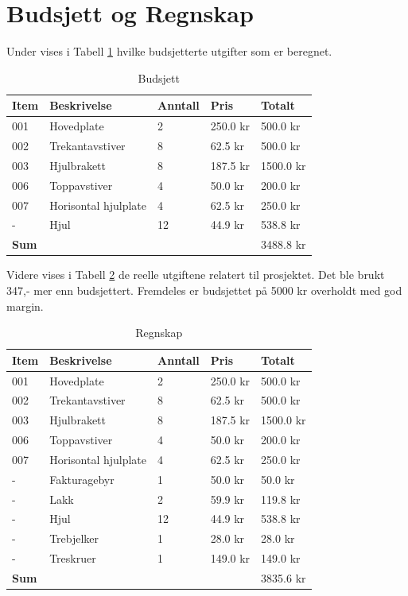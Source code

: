 \section{Budsjett og Regnskap}
Under vises i Tabell \ref{TBL1} hvilke budsjetterte utgifter som er beregnet.
\begin{table}[H]
\begin{tabular}{l l l l l}
 \textbf{Item} & \textbf{Beskrivelse} & \textbf{Anntall} & \textbf{Pris} & \textbf{Totalt}  \\
\hline
001&Hovedplate&2&250.0 kr&500.0 kr\\
002&Trekantavstiver&8&62.5 kr&500.0 kr\\
003&Hjulbrakett&8&187.5 kr& 1500.0 kr\\
006&Toppavstiver&4&50.0 kr& 200.0 kr\\
007&Horisontal hjulplate&4&62.5 kr& 250.0 kr\\
-&Hjul&12&44.9 kr& 538.8 kr\\
\hline
\textbf{Sum}&&&&3488.8 kr\\
\hline
\end{tabular}
\caption{Budsjett}
\label{TBL1}
\end{table}
Videre vises i Tabell \ref{TBL2} de reelle utgiftene relatert til prosjektet. Det ble brukt 347,- mer enn budsjettert. Fremdeles er budsjettet på 5000 kr overholdt med god margin.
\begin{table}[H]
\begin{tabular}{l l l l l}
 \textbf{Item} & \textbf{Beskrivelse} & \textbf{Anntall} & \textbf{Pris} & \textbf{Totalt}  \\
\hline
001&Hovedplate&2&250.0 kr&500.0 kr\\
002&Trekantavstiver&8&62.5 kr&500.0 kr\\
003&Hjulbrakett&8&187.5 kr& 1500.0 kr\\
006&Toppavstiver&4&50.0 kr& 200.0 kr\\
007&Horisontal hjulplate&4&62.5 kr& 250.0 kr\\
-&Fakturagebyr&1&50.0 kr&50.0 kr\\
-&Lakk&2&59.9 kr&119.8 kr\\
-&Hjul&12&44.9 kr& 538.8 kr\\
-&Trebjelker&1&28.0 kr&28.0 kr\\
-&Treskruer&1&149.0 kr&149.0 kr\\
\hline
\textbf{Sum}&&&&3835.6 kr\\
\hline
\end{tabular}
\caption{Regnskap}
\label{TBL2}
\end{table}
